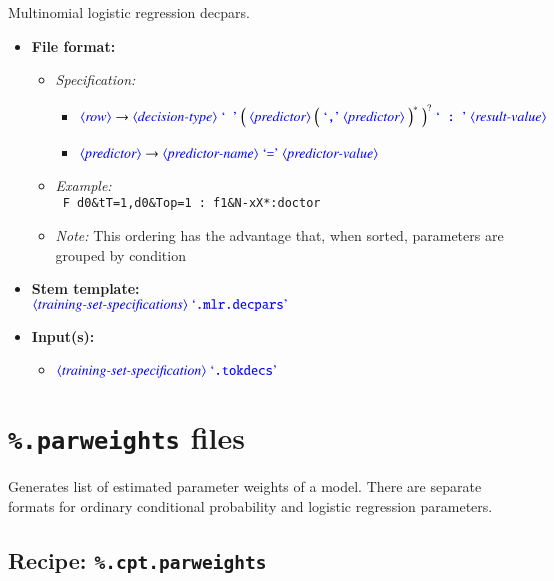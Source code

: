 \documentclass[12pt]{report}
\def\blue{\color{blue}}
\def\magenta{\color{magenta}}
\begin{document}
Multinomial logistic regression decpars.

\begin{itemize}
      \item \textbf{File format:}
      \begin{itemize}
            \item \textit{Specification:}
            \begin{itemize}
                  \item {\small $\dtype{row} \rightarrow \dtype{decision-type} \ \dcode{\ } \ \Big( \ \dtype{predictor} \ \Big( \ \dcode{,} \ \dtype{predictor} \ \Big)^* \ \Big)^? \ \dcode{\ :\ } \ \dtype{result-value}$}
                  \item {\small $\dtype{predictor} \rightarrow \dtype{predictor-name} \ \dcode{=} \ \dtype{predictor-value}$}
            \end{itemize}
            \item \textit{Example:}\\
            {\magenta\tt
            F d0\&tT=1,d0\&Top=1 : f1\&N-xX*:doctor
            }
            \item \textit{Note:} This ordering has the advantage that, when sorted, parameters are grouped by condition
      \end{itemize}
      \item \textbf{Stem template:}\\
      $\dtype{training-set-specifications}  \ \dcode{.mlr.decpars}$
      \item \textbf{Input(s):}
      \begin{itemize}
            \item $\dtype{training-set-specification} \ \dcode{.tokdecs}$
      \end{itemize}
\end{itemize}



\section{{\blue\tt \%.parweights} files}

Generates list of estimated parameter weights of a model. There are separate formats for ordinary conditional probability and logistic regression parameters.


\subsection{Recipe: \blue\tt \%.cpt.parweights}
\end{document}
